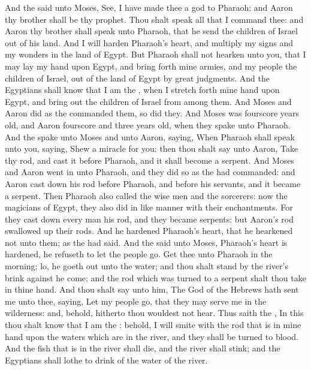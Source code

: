 \begin{biblechapter} %
\verse And the \LORD said unto Moses, See, I have made thee a god to Pharaoh: and Aaron thy brother shall be thy prophet.
\verse Thou shalt speak all that I command thee: and Aaron thy brother shall speak unto Pharaoh, that he send the children of Israel out of his land.
\verse And I will harden Pharaoh's heart, and multiply my signs and my wonders in the land of Egypt.
\verse But Pharaoh shall not hearken unto you, that I may lay my hand upon Egypt, and bring forth mine armies, and my people the children of Israel, out of the land of Egypt by great judgments.
\verse And the Egyptians shall know that I am the \LORD, when I stretch forth mine hand upon Egypt, and bring out the children of Israel from among them.
\verse And Moses and Aaron did as the \LORD commanded them, so did they.
\verse And Moses was fourscore years old, and Aaron fourscore and three years old, when they spake unto Pharaoh.
 And the \LORD spake unto Moses and unto Aaron, saying,
\verse When Pharaoh shall speak unto you, saying, Shew a miracle for you: then thou shalt say unto Aaron, Take thy rod, and cast it before Pharaoh, and it shall become a serpent.
\verse And Moses and Aaron went in unto Pharaoh, and they did so as the \LORD had commanded: and Aaron cast down his rod before Pharaoh, and before his servants, and it became a serpent.
\verse Then Pharaoh also called the wise men and the sorcerers: now the magicians of Egypt, they also did in like manner with their enchantments.
\verse For they cast down every man his rod, and they became serpents: but Aaron's rod swallowed up their rods.
\verse And he hardened Pharaoh's heart, that he hearkened not unto them; as the \LORD had said.
 And the \LORD said unto Moses, Pharaoh's heart is hardened, he refuseth to let the people go.
\verse Get thee unto Pharaoh in the morning; lo, he goeth out unto the water; and thou shalt stand by the river's brink against he come; and the rod which was turned to a serpent shalt thou take in thine hand.
\verse And thou shalt say unto him, The \LORD God of the Hebrews hath sent me unto thee, saying, Let my people go, that they may serve me in the wilderness: and, behold, hitherto thou wouldest not hear.
\verse Thus saith the \LORD, In this thou shalt know that I am the \LORD: behold, I will smite with the rod that is in mine hand upon the waters which are in the river, and they shall be turned to blood.
\verse And the fish that is in the river shall die, and the river shall stink; and the Egyptians shall lothe to drink of the water of the river.

\end{biblechapter}
